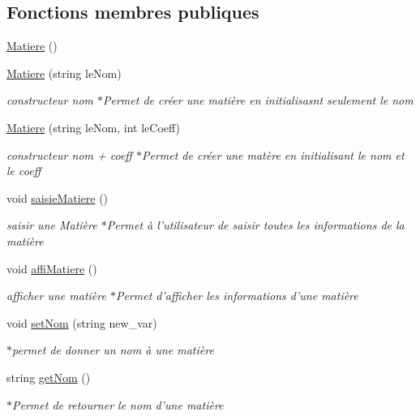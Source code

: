 \subsection*{Fonctions membres publiques}
\begin{DoxyCompactItemize}
\item 
\hyperlink{class_matiere_a0d9dbc35cd0221225366e2ba189c4b42}{Matiere} ()
\item 
\hyperlink{class_matiere_a272664e39fe50d84a258ef9ec798f096}{Matiere} (string le\-Nom)
\begin{DoxyCompactList}\small\item\em constructeur nom $\ast$\-Permet de créer une matière en initialisasnt seulement le nom \end{DoxyCompactList}\item 
\hyperlink{class_matiere_a38b701f4d07921ba6331de18be20ab77}{Matiere} (string le\-Nom, int le\-Coeff)
\begin{DoxyCompactList}\small\item\em constructeur nom + coeff $\ast$\-Permet de créer une matère en initialisant le nom et le coeff \end{DoxyCompactList}\item 
void \hyperlink{class_matiere_ac84968e1561a24e5118468edc2750f4f}{saisie\-Matiere} ()
\begin{DoxyCompactList}\small\item\em saisir une Matière $\ast$\-Permet à l'utilisateur de saisir toutes les informations de la matière \end{DoxyCompactList}\item 
void \hyperlink{class_matiere_a40ce0a7003b3d771bbcb2c745a20ad1a}{affi\-Matiere} ()
\begin{DoxyCompactList}\small\item\em afficher une matière $\ast$\-Permet d'afficher les informations d'une matière \end{DoxyCompactList}\item 
void \hyperlink{class_matiere_ae0d9312f6cbddf446614ffa00d1750ae}{set\-Nom} (string new\-\_\-var)
\begin{DoxyCompactList}\small\item\em $\ast$permet de donner un nom à une matière \end{DoxyCompactList}\item 
string \hyperlink{class_matiere_a103abd445b1bc378e0e3687875f4fcff}{get\-Nom} ()
\begin{DoxyCompactList}\small\item\em $\ast$\-Permet de retourner le nom d'une matière \end{DoxyCompactList}\item 

\end{DoxyCompactItemize}
